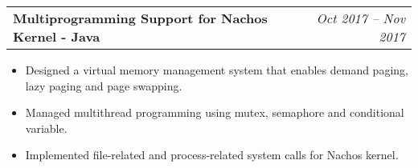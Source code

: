 \documentclass[letterpaper,11pt]{article}
\makeatletter
\newcommand{\resumeSimpleItem}[1]{
  \item\small{
    {#1 \vspace{-2pt}}
  }
}
\newcommand{\resumeProjectHeading}[2]{
  \vspace{-3pt}\item
    \begin{tabular*}{0.97\textwidth}{l@{\extracolsep{\fill}}r}
      \textbf{#1} &  \textit{\small #2} \\
    \end{tabular*}\vspace{-1pt}
}
\newcommand{\resumeItemListStart}{\begin{itemize}}
\newcommand{\resumeItemListEnd}{\end{itemize}\vspace{-5pt}}
\makeatother
\begin{document}
 

  
  
    
  
	 \resumeProjectHeading
       {Multiprogramming Support for Nachos Kernel - Java}{Oct 2017 -- Nov 2017}
       \resumeItemListStart
         \resumeSimpleItem{Designed a virtual memory management system that enables demand paging, lazy paging and page swapping.}
         \resumeSimpleItem{Managed multithread programming using mutex, semaphore and conditional variable.}
         \resumeSimpleItem{Implemented file-related and process-related system calls for Nachos kernel.}
       \resumeItemListEnd
    
         
\end{document}
